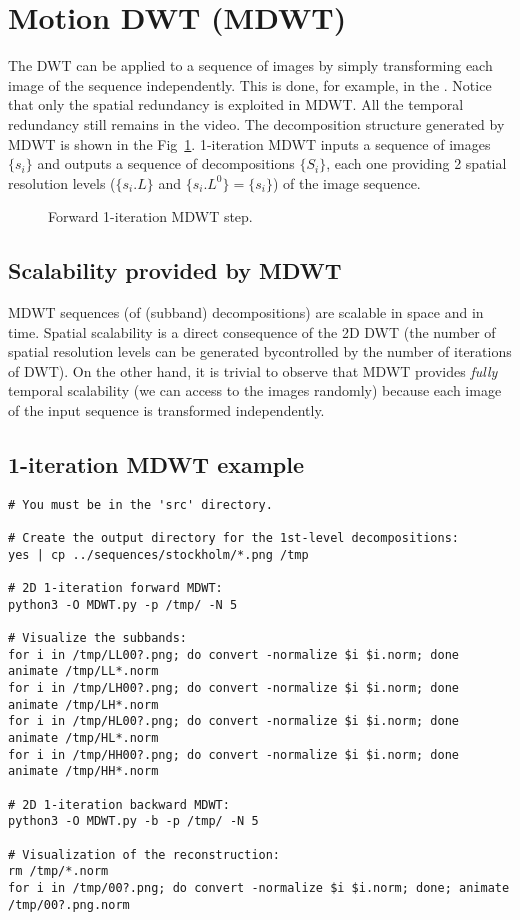 \section{Motion DWT (MDWT)}
The DWT can be applied to a sequence of images by simply transforming
each image of the sequence independently. This is done, for example,
in the . Notice that only the spatial redundancy is exploited in
MDWT. All the temporal redundancy still remains in the video. The
decomposition structure generated by MDWT is shown in the
Fig~\ref{fig:forward_MDWT}. 1-iteration MDWT inputs a sequence of
images $\{s_i\}$ and outputs a sequence of decompositions $\{S_i\}$,
each one providing 2 spatial resolution levels ($\{s_i.L\}$ and
$\{s_i.L^0\}=\{s_i\}$) of the image sequence.

\begin{figure}
  \centering
  \caption{Forward 1-iteration MDWT step.}
  \label{fig:forward_MDWT}
\end{figure}



\subsection{Scalability provided by MDWT}
MDWT sequences (of (subband) decompositions) are scalable in space and
in time. Spatial scalability is a direct consequence of the 2D DWT
(the number of spatial resolution levels can be generated bycontrolled by the number
of iterations of DWT). On the other hand, it is trivial to observe
that MDWT provides \emph{fully} temporal scalability (we can access to
the images randomly) because each image of the input sequence is
transformed independently.

\subsection{1-iteration MDWT example}
\begin{verbatim}
# You must be in the 'src' directory.

# Create the output directory for the 1st-level decompositions:
yes | cp ../sequences/stockholm/*.png /tmp

# 2D 1-iteration forward MDWT:
python3 -O MDWT.py -p /tmp/ -N 5

# Visualize the subbands:
for i in /tmp/LL00?.png; do convert -normalize $i $i.norm; done
animate /tmp/LL*.norm
for i in /tmp/LH00?.png; do convert -normalize $i $i.norm; done
animate /tmp/LH*.norm
for i in /tmp/HL00?.png; do convert -normalize $i $i.norm; done
animate /tmp/HL*.norm
for i in /tmp/HH00?.png; do convert -normalize $i $i.norm; done
animate /tmp/HH*.norm

# 2D 1-iteration backward MDWT:
python3 -O MDWT.py -b -p /tmp/ -N 5

# Visualization of the reconstruction:
rm /tmp/*.norm
for i in /tmp/00?.png; do convert -normalize $i $i.norm; done; animate /tmp/00?.png.norm
\end{verbatim}

